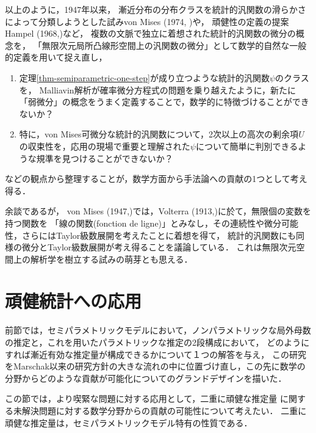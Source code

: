 \documentclass[uplatex, dvipdfmx]{jsarticle}
\begin{document}
以上のように，1947年以来，
漸近分布の分布クラスを統計的汎関数の滑らかさによって分類しようとした試みvon Mises (1974, \cite{von Mises})や，
頑健性の定義の提案Hampel (1968,\cite{Hampel68})など，
複数の文脈で独立に着想された統計的汎関数の微分の概念を，
「無限次元局所凸線形空間上の汎関数の微分」として数学的自然な一般的定義を用いて捉え直し，
\begin{enumerate}
    \item 定理\ref{thm-semiparametric-one-step}が成り立つような統計的汎関数$\psi$のクラスを，
    Malliavin解析が確率微分方程式の問題を乗り越えたように，新たに「弱微分」の概念をうまく定義することで，数学的に特徴づけることができないか？
    \item 特に，von Mises可微分な統計的汎関数について，2次以上の高次の剰余項$U$の収束性を，応用の現場で重要と理解された$\psi$について簡単に判別できるような規準を見つけることができないか？
\end{enumerate}
などの観点から整理することが，数学方面から手法論への貢献の1つとして考え得る．

\begin{history}
    余談であるが，
    von Mises (1947,\cite{von Mises})では，Volterra (1913,\cite{Vito Volterra})に於て，無限個の変数を持つ関数を
    「線の関数(fonction de ligne)」とみなし，その連続性や微分可能性，さらにはTaylor級数展開を考えたことに着想を得て，
    統計的汎関数にも同様の微分とTaylor級数展開が考え得ることを議論している．
    これは無限次元空間上の解析学を樹立する試みの萌芽とも思える．
\end{history}

\section{頑健統計への応用}

\begin{tcolorbox}[colframe=ForestGreen, colback=ForestGreen!10!white,breakable,colbacktitle=ForestGreen!40!white,coltitle=black,fonttitle=\bfseries\sffamily,
title=]
    前節では，セミパラメトリックモデルにおいて，ノンパラメトリックな局外母数の推定と，これを用いたパラメトリックな推定の2段構成において，
    どのようにすれば漸近有効な推定量が構成できるかについて１つの解答を与え，
    この研究をMarschak以来の研究方針の大きな流れの中に位置づけ直し，この先に数学の分野からどのような貢献が可能化についてのグランドデザインを描いた．

    この節では，より喫緊な問題に対する応用として，二重に頑健な推定量
    に関する未解決問題に対する数学分野からの貢献の可能性について考えたい．
    二重に頑健な推定量は，セミパラメトリックモデル特有の性質である．
\end{tcolorbox}
\end{document}
